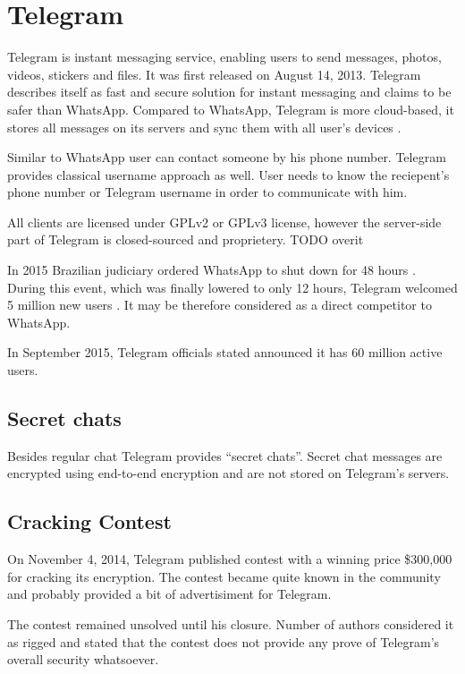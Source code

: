 \documentclass[thesis=M,english]{FITthesis}[2012/10/20]
\begin{document}
\section{Telegram}

Telegram is instant messaging service, enabling users to send messages, photos, videos, stickers and files. It was first released on August 14, 2013\cite{telegramfaq}. Telegram describes itself as fast and secure solution for instant messaging \cite{telegramfaq} and claims to be safer than WhatsApp\cite{telegramfaq}. Compared to WhatsApp, Telegram is more cloud-based, it stores all messages on its servers and sync them with all user's devices \cite{telegramfaq}. 

Similar to WhatsApp user can contact someone by his phone number. Telegram provides classical username approach as well. User needs to know the reciepent's phone number or Telegram username in order to communicate with him.

All clients are licensed under GPLv2 or GPLv3 license, however the server-side part of Telegram is closed-sourced and proprietery. TODO overit

In 2015 Brazilian judiciary ordered WhatsApp to shut down for 48 hours \cite{whatsappbrazil}. During this event, which was finally lowered to only 12 hours, Telegram welcomed 5 million new users \cite{whatsappbrazil}. It may be therefore considered as a direct competitor to WhatsApp.

In September 2015, Telegram officials stated announced it has 60 million active users.\cite{x}


\subsection{Secret chats}

Besides regular chat Telegram provides ``secret chats''. Secret chat messages are encrypted using end-to-end encryption and are not stored on Telegram's servers\cite{telegramfaq}.

\subsection{Cracking Contest}

On November 4, 2014, Telegram published contest with a winning price \$300,000 for cracking its encryption. The contest became quite known in the community and probably provided a bit of advertisiment for Telegram.

The contest remained unsolved until his closure. Number of authors considered it as rigged and stated that the contest does not provide any prove of Telegram's overall security whatsoever.\cite{telegramcontestfail}\cite{telegramcontestfail2}
\end{document}

